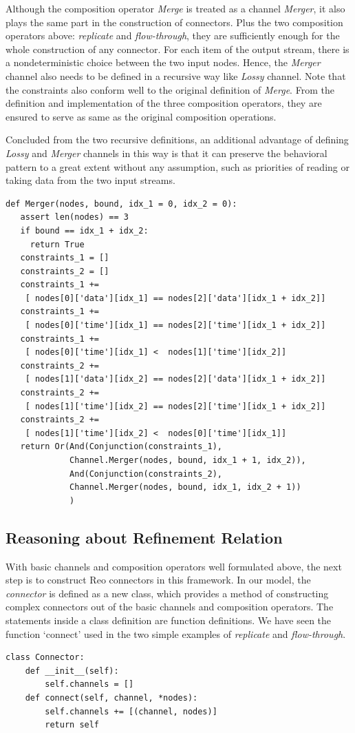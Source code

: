 \documentclass[preprint,3p]{elsarticle}
\begin{document}
Although the composition operator \emph{Merge} is treated as a channel \emph{Merger}, it also plays the same part in the construction of connectors.  Plus the two composition operators above: \emph{replicate} and \emph{flow-through}, they are sufficiently enough for the whole construction of any connector. For each item of the output stream, there is a nondeterministic choice between the two input nodes. Hence, the \emph{Merger} channel also needs to be defined in a recursive way like \emph{Lossy} channel. Note that the constraints also conform well to the original definition of \emph{Merge}. From the definition and implementation of the three composition operators, they are ensured to serve as same as the original composition operations.
 
Concluded from the two recursive definitions, an additional advantage of defining \emph{Lossy} and \emph{Merger} channels in this way is that it can preserve the behavioral pattern to a great extent without any assumption, such as priorities of reading or taking data from the two input streams.
\begin{lstlisting}[frame=single]
def Merger(nodes, bound, idx_1 = 0, idx_2 = 0):
   assert len(nodes) == 3
   if bound == idx_1 + idx_2:
     return True
   constraints_1 = []
   constraints_2 = []
   constraints_1 +=
    [ nodes[0]['data'][idx_1] == nodes[2]['data'][idx_1 + idx_2]]
   constraints_1 +=
    [ nodes[0]['time'][idx_1] == nodes[2]['time'][idx_1 + idx_2]]
   constraints_1 +=
    [ nodes[0]['time'][idx_1] <  nodes[1]['time'][idx_2]]
   constraints_2 +=
    [ nodes[1]['data'][idx_2] == nodes[2]['data'][idx_1 + idx_2]]
   constraints_2 +=
    [ nodes[1]['time'][idx_2] == nodes[2]['time'][idx_1 + idx_2]]
   constraints_2 +=
    [ nodes[1]['time'][idx_2] <  nodes[0]['time'][idx_1]]
   return Or(And(Conjunction(constraints_1),
             Channel.Merger(nodes, bound, idx_1 + 1, idx_2)),
             And(Conjunction(constraints_2),
             Channel.Merger(nodes, bound, idx_1, idx_2 + 1))
             )
\end{lstlisting}

\subsection{Reasoning about Refinement Relation}
With basic channels and composition operators well formulated above, the next step is to construct Reo connectors in this framework. In our model, the \emph{connector} is defined as a new class, which provides a method of constructing complex connectors out of the basic channels and composition operators.
The statements inside a class definition are function definitions. We have seen the function `connect' used in the two simple examples of \emph{replicate} and \emph{flow-through}.
\begin{lstlisting}[frame=single]
class Connector:
    def __init__(self):
        self.channels = []
    def connect(self, channel, *nodes):
        self.channels += [(channel, nodes)]
        return self
\end{lstlisting}
\end{document}
